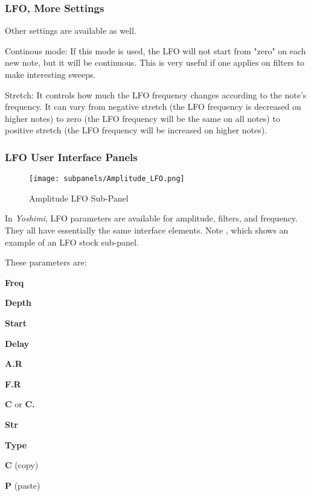 \subsubsection{LFO, More Settings}
\label{subsubsec:lfo_more_settings}

   Other settings are available as well.

   Continous mode: If this mode is used, the LFO will not start from "zero" on
   each new note, but it will be continuous. This is very useful if one
   applies on filters to make interesting sweeps.

   Stretch: It controls how much the LFO frequency changes according to the
   note’s frequency. It can vary from negative stretch (the LFO frequency is
   decreased on higher notes) to zero (the LFO frequency will be the same
   on all notes) to positive stretch (the LFO frequency will be
   increased on higher notes).

\subsubsection{LFO User Interface Panels}
\label{subsubsec:lfo_user_interface_panels}

   \setcounter{ItemCounter}{0}      %

\begin{figure}[H]
   \centering 
   \texttt{[image: subpanels/Amplitude\_LFO.png]}
   \caption[Amplitude LFO Sub-Panel]{Amplitude LFO Sub-Panel}
   \label{fig:amplitude_lfo}
\end{figure}

   In \textsl{Yoshimi}, LFO parameters are available for amplitude, filters,
   and frequency.  They all have essentially the same interface elements.
   Note , which
   shows an example of an LFO stock sub-panel.

These parameters are:

   \begin{enumber}
      \item \textbf{Freq}
      \item \textbf{Depth}
      \item \textbf{Start}
      \item \textbf{Delay}
      \item \textbf{A.R}
      \item \textbf{F.R}
      \item \textbf{C} or \textbf{C.}
      \item \textbf{Str}
      \item \textbf{Type}
      \item \textbf{C} (copy)
      \item \textbf{P} (paste)
   \end{enumber}

